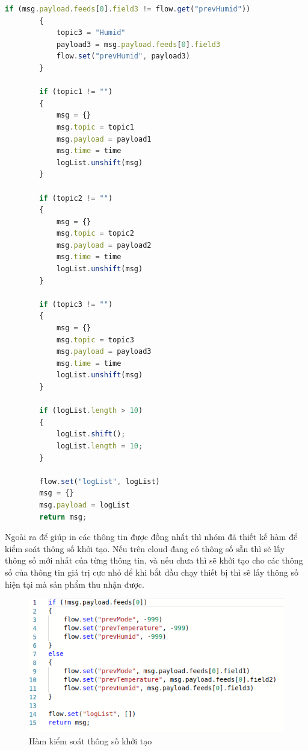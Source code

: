 \documentclass{report}
\begin{document}
\begin{enumerate}
\begin{lstlisting}[language=JavaScript, caption={function of control log list}]
        if (msg.payload.feeds[0].field3 != flow.get("prevHumid")) 
        {
            topic3 = "Humid"
            payload3 = msg.payload.feeds[0].field3
            flow.set("prevHumid", payload3)
        }

        if (topic1 != "")
        {
            msg = {}
            msg.topic = topic1
            msg.payload = payload1
            msg.time = time
            logList.unshift(msg)
        }

        if (topic2 != "") 
        {
            msg = {}
            msg.topic = topic2
            msg.payload = payload2
            msg.time = time
            logList.unshift(msg)
        }

        if (topic3 != "") 
        {
            msg = {}
            msg.topic = topic3
            msg.payload = payload3
            msg.time = time
            logList.unshift(msg)
        }

        if (logList.length > 10) 
        {
            logList.shift();
            logList.length = 10;
        }

        flow.set("logList", logList)
        msg = {}
        msg.payload = logList
        return msg;
    \end{lstlisting}

    Ngoài ra để  giúp in các thông tin được đồng nhất thì nhóm đã thiết kế  hàm để kiểm soát thông số  khởi tạo. Nếu trên cloud đang có thông số sẵn thì sẽ lấy thông số mới nhất của từng thông tin, và nếu chưa thì sẽ khởi tạo cho các thông số của thông tin giá trị cực nhỏ để khi bắt đầu chạy thiết bị thì sẽ lấy thông số  hiện tại mà sản phẩm thu nhận được.
    \begin{figure}[H]
        \includegraphics[width=\textwidth, keepaspectratio]{img/flow/init_log_value.png}
        \centering
        \caption{Hàm kiểm soát thông số khởi tạo}
    \end{figure}
\end{enumerate}
\pagebreak
\end{document}
